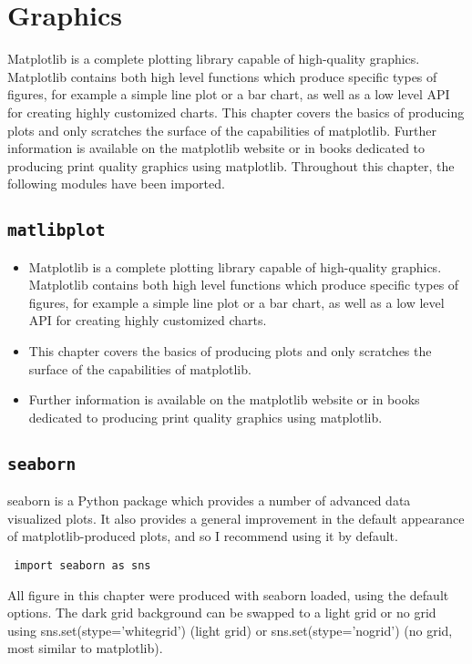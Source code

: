 \documentclass[KSmain.tex]{subfiles}
\begin{document}
 
\newpage
\section{Graphics}
Matplotlib is a complete plotting library capable of high-quality graphics. Matplotlib contains both high
level functions which produce specific types of figures, for example a simple line plot or a bar chart, as
well as a low level API for creating highly customized charts. This chapter covers the basics of producing
plots and only scratches the surface of the capabilities of matplotlib. Further information is available on
the matplotlib website or in books dedicated to producing print quality graphics using matplotlib.
Throughout this chapter, the following modules have been imported.


\subsection{\texttt{matlibplot}}
\begin{itemize}
\item Matplotlib is a complete plotting library capable of high-quality graphics. Matplotlib contains both high level functions which produce specific types of figures, for example a simple line plot or a bar chart, as
well as a low level API for creating highly customized charts. 

\item This chapter covers the basics of producing
plots and only scratches the surface of the capabilities of matplotlib. 
\item Further information is available on
the matplotlib website or in books dedicated to producing print quality graphics using matplotlib.
\end{itemize}
\subsection{\texttt{seaborn}}

seaborn is a Python package which provides a number of advanced data visualized plots. It also provides a
general improvement in the default appearance of matplotlib-produced plots, and so I recommend using
it by default.

\begin{framed}
\begin{verbatim}
 import seaborn as sns

\end{verbatim}
\end{framed}
All figure in this chapter were produced with seaborn loaded, using the default options. The dark grid
background can be swapped to a light grid or no grid using sns.set(stype=’whitegrid’) (light grid) or
sns.set(stype=’nogrid’) (no grid, most similar to matplotlib).
\end{document}
